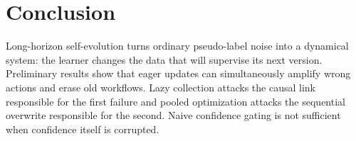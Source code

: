 \documentclass[10pt]{article}
\begin{document}
\section{Conclusion}

Long-horizon self-evolution turns ordinary pseudo-label noise into a dynamical
system: the learner changes the data that will supervise its next version.
Preliminary results show that eager updates can simultaneously amplify wrong
actions and erase old workflows.  Lazy collection attacks the causal link
responsible for the first failure and pooled optimization attacks the sequential
overwrite responsible for the second.  Naive confidence gating is not
sufficient when confidence itself is corrupted.



\end{document}
